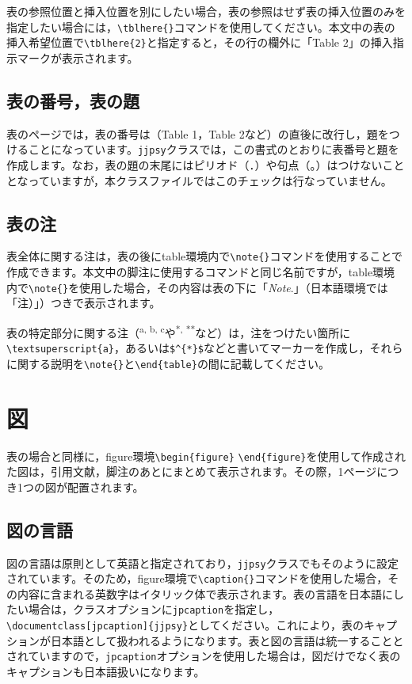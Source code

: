 \documentclass{jjpsy}
\begin{document}
表の参照位置と挿入位置を別にしたい場合，表の参照はせず表の挿入位置のみを指定したい場合には，\texttt{\textbackslash{}tblhere\{\}}コマンドを使用してください。本文中の表の挿入希望位置で\texttt{\textbackslash{}tblhere\{2\}}と指定すると，その行の欄外に「Table 2」の挿入指示マークが表示されます。


\subsection{表の番号，表の題}

表のページでは，表の番号は（Table 1，Table 2など）の直後に改行し，題をつけることになっています。\texttt{jjpsy}クラスでは，この書式のとおりに表番号と題を作成します。なお，表の題の末尾にはピリオド（．）や句点（。）はつけないこととなっていますが，本クラスファイルではこのチェックは行なっていません。

\subsection{表の注}

表全体に関する注は，表の後にtable環境内で\texttt{\textbackslash{}note\{\}}コマンドを使用することで作成できます。本文中の脚注に使用するコマンドと同じ名前ですが，table環境内で\texttt{\textbackslash{}note\{\}}を使用した場合，その内容は表の下に「\emph{Note}.」（日本語環境では「注）」）つきで表示されます。

表の特定部分に関する注（\textsuperscript{a, b, c}や\textsuperscript{*, **}など）は，注をつけたい箇所に\texttt{\textbackslash{}textsuperscript\{a\}}，あるいは\texttt{\$\textasciicircum\{*\}\$}などと書いてマーカーを作成し，それらに関する説明を\texttt{\textbackslash{}note\{\}}と\texttt{\textbackslash{}end\{table\}}の間に記載してください。


\section{図}

表の場合と同様に，figure環境\texttt{\textbackslash{}begin\{figure\}} \dash\texttt{\textbackslash{}end\{figure\}}を使用して作成された図は，引用文献，脚注のあとにまとめて表示されます。その際，1ページにつき1つの図が配置されます。

\subsection{図の言語}

図の言語は原則として英語と指定されており，\texttt{jjpsy}クラスでもそのように設定されています。そのため，figure環境で\texttt{\textbackslash{}caption\{\}}コマンドを使用した場合，その内容に含まれる英数字はイタリック体で表示されます。表の言語を日本語にしたい場合は，クラスオプションに\texttt{jpcaption}を指定し，\texttt{\textbackslash{}documentclass[jpcaption]\{jjpsy\}}としてください。これにより，表のキャプションが日本語として扱われるようになります。表と図の言語は統一することとされていますので，\texttt{jpcaption}オプションを使用した場合は，図だけでなく表のキャプションも日本語扱いになります。
\end{document}
